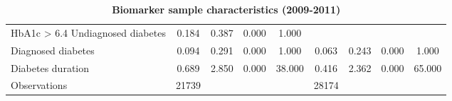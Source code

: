 \begin{table}[h!]
\begin{center}
{\begin{tabular}{l*{2}{cccc}}
HbA1c > 6.4%
Undiagnosed diabetes&       0.184&       0.387&       0.000&       1.000&            &            &            &            \\
Diagnosed diabetes  &       0.094&       0.291&       0.000&       1.000&       0.063&       0.243&       0.000&       1.000\\
Diabetes duration   &       0.689&       2.850&       0.000&      38.000&       0.416&       2.362&       0.000&      65.000\\
\midrule
Observations        &       21739&            &            &            &       28174&            &            &            \\
\bottomrule
\end{tabular} }
\caption{\label{tab:Biomarker-sample-characteristics}\textbf{Biomarker sample characteristics
(2009-2011) }}
\end{center}
\end{table}  
  
  
  
  
  
  
  
  
  
  
  
  
  
  
  
  
  
  
  